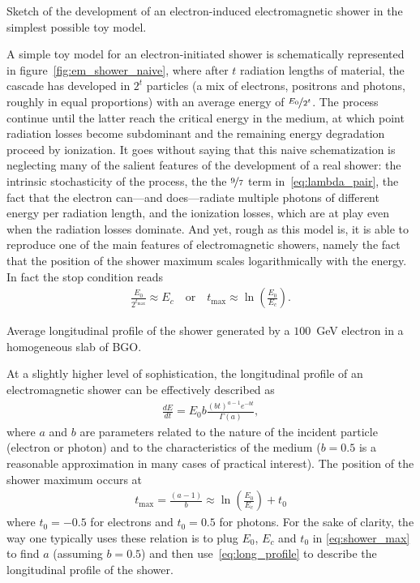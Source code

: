 \begin{marginfigure}
  
  \caption{Sketch of the development of an electron-induced electromagnetic shower
  in the simplest possible toy model.}
  \label{fig:em_shower_naive}
\end{marginfigure}

A simple toy model for an electron-initiated shower is schematically represented
in figure~\ref{fig:em_shower_naive}, where after $t$ radiation lengths of material,
the cascade has developed in $2^t$ particles (a mix of electrons, positrons and
photons, roughly in equal proportions) with an average energy of $\nicefrac{E_0}{2^t}$.
The process continue until the latter reach the critical energy in the medium,
at which point radiation losses become subdominant and the remaining energy
degradation proceed by ionization.
It goes without saying that this naive schematization is neglecting many of the
salient features of the development of a real shower: the intrinsic stochasticity
of the process, the the $\nicefrac{9}{7}$ term in~\eqref{eq:lambda_pair}, the fact
that the electron can---and does---radiate multiple photons of different energy
per radiation length, and the ionization losses, which are at play even when the
radiation losses dominate. And yet, rough as this model is, it is able to reproduce
one of the main features of electromagnetic showers, namely the fact that the
position of the shower maximum scales logarithmically with the energy. In fact the
stop condition reads
\begin{align}
  \frac{E_0}{2^{t_\text{max}}} \approx E_c
  \quad\text{or}\quad
  t_\text{max} \approx \ln \left(\frac{E_0}{E_c}\right).
\end{align}

\begin{marginfigure}
  
  \caption{Average longitudinal profile of the shower generated by a
     $100$~GeV electron in a homogeneous slab of BGO.}
  \label{fig:shower_longitudinal_profile}
\end{marginfigure}

At a slightly higher level of sophistication, the longitudinal profile of an
electromagnetic shower can be effectively described as
\begin{align}\label{eq:long_profile}
  \frac{dE}{dt} = E_0 b \frac{(bt)^{a-1} e^{-bt}}{\Gamma(a)},
\end{align}
where $a$ and $b$ are parameters related to the nature of the incident particle
(electron or photon) and to the characteristics of the medium ($b = 0.5$
is a reasonable approximation in many cases of practical interest).
The position of the shower maximum occurs at
\begin{align}\label{eq:shower_max}
  t_\text{max} = \frac{(a - 1)}{b} \approx
  \ln \left(\frac{E_0}{E_c}\right) + t_0
\end{align}
where $t_0 = -0.5$ for electrons and $t_0 = 0.5$ for photons. For the sake
of clarity, the way one typically uses these relation is to plug $E_0$, $E_c$
and $t_0$ in \eqref{eq:shower_max} to find $a$ (assuming $b = 0.5$) and then
use~\eqref{eq:long_profile} to describe the longitudinal profile of the shower.

